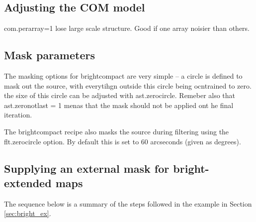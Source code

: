 \documentclass[twoside,11pt]{article}
\newcommand{\xlabel}[1]{}
\renewcommand{\_}{\texttt{\symbol{95}}}
\begin{document}
\subsection{\xlabel{filter}Adjusting the COM  model}
\label{sec:com}
com.perarray=1 lose large scale structure. Good if one array noisier than others.


\subsection{\xlabel{mask}Mask parameters }
\label{sec:mask}
The masking options for bright\_compact are very simple -- a circle is defined to mask out the source, with everytihgn outside this circle being ocntrained to zero. the sixe of this circle can be adjusted with ast.zero\_circle. Remeber also that ast.zero\_notlast = 1 menas that the mask should not be applied ont he final iteration. 

The bright\_compact recipe also masks the source during filtering using the flt.zero\_circle option. By default this is set to 60 arcseconds (given as degrees).



\subsection{\xlabel{maskbe}Supplying an external mask for bright-extended maps}
\label{sec:maskbe}
The sequence below is a summary of the steps followed in the example in Section \ref{sec:bright_ex}. 
\end{document}
